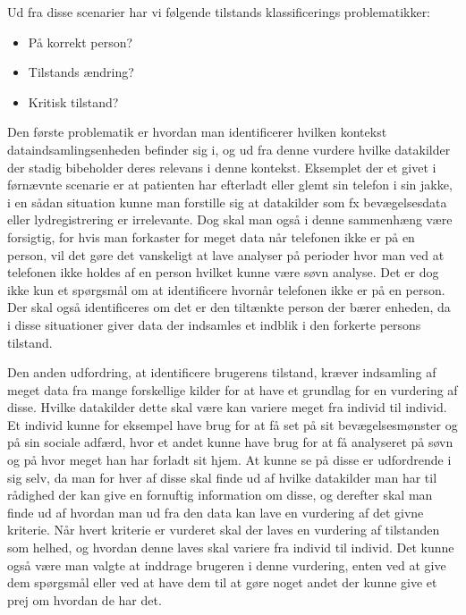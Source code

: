 Ud fra disse scenarier har vi følgende tilstands klassificerings problematikker:
\begin{itemize}
\item På korrekt person?
\item Tilstands ændring?
\item Kritisk tilstand?
\end{itemize}

Den første problematik er hvordan man identificerer hvilken kontekst dataindsamlingsenheden befinder sig i, og ud fra denne vurdere hvilke datakilder der stadig bibeholder deres relevans i denne kontekst.
Eksemplet der et givet i førnævnte scenarie er at patienten har efterladt eller glemt sin telefon i sin jakke, i en sådan situation kunne man forstille sig at datakilder som fx bevægelsesdata eller lydregistrering er irrelevante.
Dog skal man også i denne sammenhæng være forsigtig, for hvis man forkaster for meget data når telefonen ikke er på en person, vil det gøre det vanskeligt at lave analyser på perioder hvor man ved at telefonen ikke holdes af en person hvilket kunne være søvn analyse. 
Det er dog ikke kun et spørgsmål om at identificere hvornår telefonen ikke er på en person.
Der skal også identificeres om det er den tiltænkte person der bærer enheden, da i disse situationer giver data der indsamles et indblik i den forkerte persons tilstand.

Den anden udfordring, at identificere brugerens tilstand, kræver indsamling af meget data fra mange forskellige kilder for at have et grundlag for en vurdering af disse.
Hvilke datakilder dette skal være kan variere meget fra individ til individ.
Et individ kunne for eksempel have brug for at få set på sit bevægelsesmønster og på sin sociale adfærd, hvor et andet kunne have brug for at få analyseret på søvn og på hvor meget han har forladt sit hjem.
At kunne se på disse er udfordrende i sig selv, da man for hver af disse skal finde ud af hvilke datakilder man har til rådighed der kan give en fornuftig information om disse, og derefter skal man finde ud af hvordan man ud fra den data kan lave en vurdering af det givne kriterie.
Når hvert kriterie er vurderet skal der laves en vurdering af tilstanden som helhed, og hvordan denne laves skal variere fra individ til individ.
Det kunne også være man valgte at inddrage brugeren i denne vurdering, enten ved at give dem spørgsmål eller ved at have dem til at gøre noget andet der kunne give et prej om hvordan de har det.

